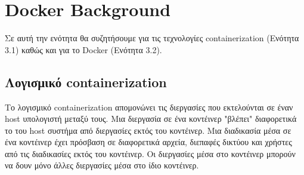\chapter{\textlatin{Docker Background}}
\label{dockerBackground}

Σε αυτή την ενότητα θα συζητήσουμε για τις τεχνολογίες
\textlatin{containerization} (Ενότητα 3.1) καθώς και για το
\textlatin{Docker} (Ενότητα 3.2).


\section{Λογισμικό \textlatin{containerization}}

Το λογισμικό \textlatin{containerization} απομονώνει τις διεργασίες που
εκτελούνται σε έναν \textlatin{host} υπολογιστή μεταξύ τους. Μια διεργασία σε
ένα κοντέινερ "βλέπει" διαφορετικά το του host συστήμα από διεργασίες εκτός του
κοντέινερ. Μια διαδικασία μέσα σε ένα κοντέινερ έχει πρόσβαση σε διαφορετικά
αρχεία, διεπαφές δικτύου και χρήστες από τις διαδικασίες εκτός του κοντέινερ.
Οι διεργασίες μέσα στο κοντέινερ μπορούν να δουν μόνο άλλες διεργασίες μέσα
στο ίδιο κοντέινερ.


